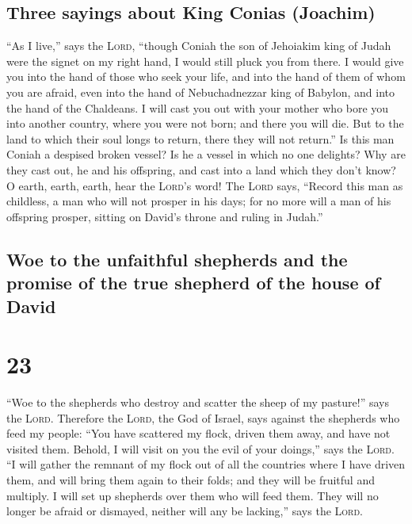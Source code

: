 \hypertarget{three-sayings-about-king-conias-joachim}{%
\subsection{Three sayings about King Conias
(Joachim)}\label{three-sayings-about-king-conias-joachim}}

 ``As I live,'' says the \textsc{Lord}, ``though Coniah
the son of Jehoiakim king of Judah were the signet on my right hand, I
would still pluck you from there.  I would give you into
the hand of those who seek your life, and into the hand of them of whom
you are afraid, even into the hand of Nebuchadnezzar king of Babylon,
and into the hand of the Chaldeans.  I will cast you out
with your mother who bore you into another country, where you were not
born; and there you will die.  But to the land to which
their soul longs to return, there they will not return.''
 Is this man Coniah a despised broken vessel? Is he a
vessel in which no one delights? Why are they cast out, he and his
offspring, and cast into a land which they don't know?  O
earth, earth, earth, hear the \textsc{Lord}'s word!  The
\textsc{Lord} says, ``Record this man as childless, a man who will not
prosper in his days; for no more will a man of his offspring prosper,
sitting on David's throne and ruling in Judah.''

\hypertarget{woe-to-the-unfaithful-shepherds-and-the-promise-of-the-true-shepherd-of-the-house-of-david}{%
\subsection{Woe to the unfaithful shepherds and the promise of the true
shepherd of the house of
David}\label{woe-to-the-unfaithful-shepherds-and-the-promise-of-the-true-shepherd-of-the-house-of-david}}

\hypertarget{section-22}{%
\section{23}\label{section-22}}

 ``Woe to the shepherds who destroy and scatter the sheep
of my pasture!'' says the \textsc{Lord}.  Therefore the
\textsc{Lord}, the God of Israel, says against the shepherds who feed my
people: ``You have scattered my flock, driven them away, and have not
visited them. Behold, I will visit on you the evil of your doings,''
says the \textsc{Lord}.  ``I will gather the remnant of my
flock out of all the countries where I have driven them, and will bring
them again to their folds; and they will be fruitful and multiply.
 I will set up shepherds over them who will feed them.
They will no longer be afraid or dismayed, neither will any be
lacking,'' says the \textsc{Lord}.

